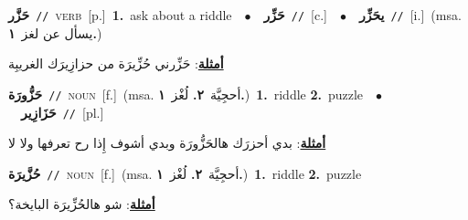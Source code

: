 \documentclass[10pt,a4paper,twoside]{article} %
\begin{document}
\begin{multicols}{2}
{\setlength\topsep{0pt}\textbf{\foreignlanguage{arabic}{حَزَّر}}\ {\color{gray}\texttt{//}\color{black}}\ \textsc{verb}\ [p.]\ \textbf{1.}~ask about a riddle\ \ $\bullet$\ \ \setlength\topsep{0pt}\textbf{\foreignlanguage{arabic}{حَزِّر}}\ {\color{gray}\texttt{//}\color{black}}\ [c.]\ \ $\bullet$\ \ \setlength\topsep{0pt}\textbf{\foreignlanguage{arabic}{يحَزِّر}}\ {\color{gray}\texttt{//}\color{black}}\ [i.]\ \color{gray}(msa. \foreignlanguage{arabic}{يسأل عن لغز}~\foreignlanguage{arabic}{\textbf{١.}})\color{black}\  \begin{flushright}\color{gray}\foreignlanguage{arabic}{\textbf{\underline{\foreignlanguage{arabic}{أمثلة}}}: حَزِّرني حُزِّيرَة من حزازِيرَك الغريبِة}\end{flushright}\color{black}} \vspace{2mm}

{\setlength\topsep{0pt}\textbf{\foreignlanguage{arabic}{حَزُّورَة}}\ {\color{gray}\texttt{//}\color{black}}\ \textsc{noun}\ [f.]\ \color{gray}(msa. \foreignlanguage{arabic}{أحجِيَّة}~\foreignlanguage{arabic}{\textbf{٢.}}  \foreignlanguage{arabic}{لُغْز}~\foreignlanguage{arabic}{\textbf{١.}})\color{black}\ \textbf{1.}~riddle  \textbf{2.}~puzzle\ \ $\bullet$\ \ \setlength\topsep{0pt}\textbf{\foreignlanguage{arabic}{حَزَازِير}}\ {\color{gray}\texttt{//}\color{black}}\ [pl.]\  \begin{flushright}\color{gray}\foreignlanguage{arabic}{\textbf{\underline{\foreignlanguage{arabic}{أمثلة}}}: بدي أحزرَك هالحَزُّورَة وبدي أشوف إِذا رح تعرفها ولا لا}\end{flushright}\color{black}} \vspace{2mm}

{\setlength\topsep{0pt}\textbf{\foreignlanguage{arabic}{حُزَّيرَة}}\ {\color{gray}\texttt{//}\color{black}}\ \textsc{noun}\ [f.]\ \color{gray}(msa. \foreignlanguage{arabic}{أحجِيَّة}~\foreignlanguage{arabic}{\textbf{٢.}}  \foreignlanguage{arabic}{لُغْز}~\foreignlanguage{arabic}{\textbf{١.}})\color{black}\ \textbf{1.}~riddle  \textbf{2.}~puzzle\  \begin{flushright}\color{gray}\foreignlanguage{arabic}{\textbf{\underline{\foreignlanguage{arabic}{أمثلة}}}: شو هالحُزِّيرَة البايخة؟}\end{flushright}\color{black}} \vspace{2mm}


\end{multicols}
\end{document}
